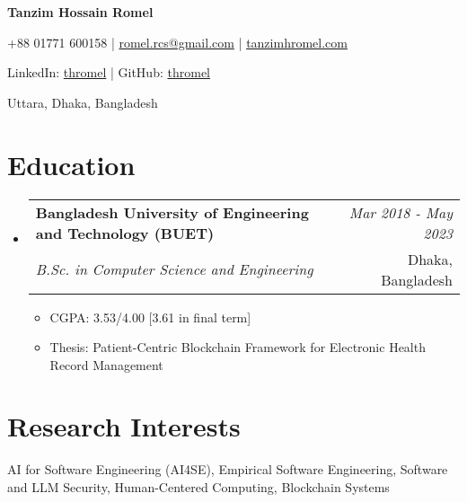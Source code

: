 \documentclass[a4paper,11pt]{article}
\makeatletter
\newcommand{\resumeSubheading}[4]{
\vspace{0.5mm}\item
    \begin{tabular*}{0.98\textwidth}[t]{l@{\extracolsep{\fill}}r}
        \textbf{#1} & \textit{\footnotesize{#4}} \\
        \textit{\footnotesize{#3}} &  \footnotesize{#2}\\
    \end{tabular*}
    \vspace{-2.4mm}
}
\newcommand{\resumeSubHeadingListStart}{\begin{itemize}[leftmargin=*,labelsep=1mm]}
\newcommand{\resumeItemListStart}{\begin{itemize}[leftmargin=*,labelsep=1mm,itemsep=0.5mm]}
\newcommand{\resumeSubHeadingListEnd}{\end{itemize}\vspace{2mm}}
\newcommand{\resumeItemListEnd}{\end{itemize}\vspace{-2mm}}
\newcommand{\headerfontiii}{\fontfamily{ppl}\selectfont} %
\makeatother
\begin{document}
\headerfontiii

\begin{center}
    {\Huge\textbf{Tanzim Hossain Romel}}
\end{center}
\vspace{-6mm}

\begin{center}
    \small{
    +88 01771 600158 | \href{mailto:romel.rcs@gmail.com}{romel.rcs@gmail.com} | 
    \href{https://tanzimhromel.com}{tanzimhromel.com}
    }
\end{center}
\vspace{-6mm}

\begin{center}
    \small{
    LinkedIn: \href{https://www.linkedin.com/in/thromel/}{thromel} | 
    GitHub: \href{https://github.com/thromel}{thromel}
    }
\end{center}
\vspace{-6mm}
\begin{center}
    \small{Uttara, Dhaka, Bangladesh}
\end{center}

\vspace{-4mm}

\section{\textbf{Education}}
\vspace{-0.4mm}
\resumeSubHeadingListStart

\resumeSubheading
{Bangladesh University of Engineering and Technology (BUET)}{Dhaka, Bangladesh}
{B.Sc. in Computer Science and Engineering}{Mar 2018 - May 2023}
\resumeItemListStart
\item CGPA: 3.53/4.00 [3.61 in final term]
\item Thesis: Patient-Centric Blockchain Framework for Electronic Health Record Management
\resumeItemListEnd

\resumeSubHeadingListEnd
\vspace{-6mm}

\section{\textbf{Research Interests}}
\vspace{1mm}
\small{
AI for Software Engineering (AI4SE), Empirical Software Engineering, Software and LLM Security, Human-Centered Computing, Blockchain Systems
}
\vspace{-2mm}
\end{document}
